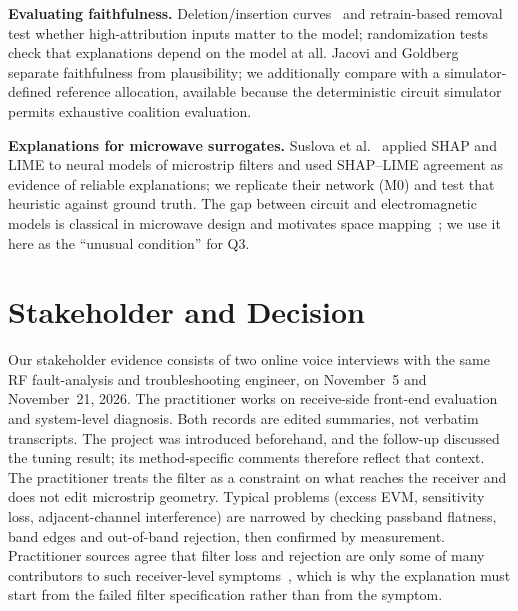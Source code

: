 \documentclass[conference,10pt]{IEEEtran}
\begin{document}
\textbf{Evaluating faithfulness.} Deletion/insertion curves~\cite{petsiuk2018} and retrain-based removal~\cite{hooker2019} test whether high-attribution inputs matter to the model; randomization tests~\cite{adebayo2018} check that explanations depend on the model at all.
Jacovi and Goldberg~\cite{jacovi2020} separate faithfulness from plausibility; we additionally compare with a simulator-defined reference allocation, available because the deterministic circuit simulator permits exhaustive coalition evaluation.

\textbf{Explanations for microwave surrogates.} Suslova et al.~\cite{suslova2026} applied SHAP and LIME to neural models of microstrip filters and used SHAP--LIME agreement as evidence of reliable explanations; we replicate their network (M0) and test that heuristic against ground truth.
The gap between circuit and electromagnetic models is classical in microwave design and motivates space mapping~\cite{bandler1994}; we use it here as the ``unusual condition'' for Q3.

\section{Stakeholder and Decision}
Our stakeholder evidence consists of two online voice interviews with the same RF fault-analysis and troubleshooting engineer, on November~5 and November~21, 2026. The practitioner works on receive-side front-end evaluation and system-level diagnosis.
Both records are edited summaries, not verbatim transcripts. The project was introduced beforehand, and the follow-up discussed the tuning result; its method-specific comments therefore reflect that context.
The practitioner treats the filter as a constraint on what reaches the receiver and does not edit microstrip geometry.
Typical problems (excess EVM, sensitivity loss, adjacent-channel interference) are narrowed by checking passband flatness, band edges and out-of-band rejection, then confirmed by measurement.
Practitioner sources agree that filter loss and rejection are only some of many contributors to such receiver-level symptoms~\cite{rs_evm,adi_an1354}, which is why the explanation must start from the failed filter specification rather than from the symptom.
\end{document}
